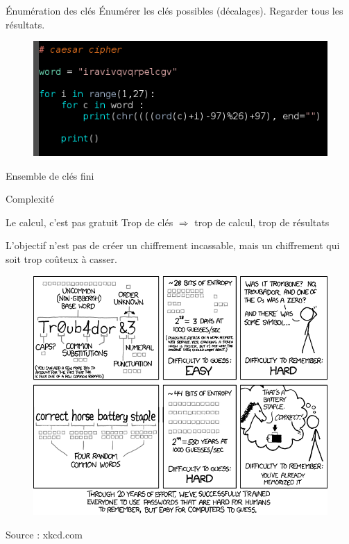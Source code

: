 \documentclass{beamer}
\begin{document}
\begin{frame}{Énumération des clés}
  Énumérer les clés possibles (décalages). Regarder tous les résultats.

  \begin{figure}
    \centering
    \includegraphics[scale = 0.6]{cesarcode.png}
\end{figure}

\begin{block}{}
Ensemble de clés fini
\end{block}

  \end{frame}



\begin{frame}{Complexité}

  \begin{alertblock}{Le calcul, c'est pas gratuit}
    Trop de clés $\Rightarrow$ trop de calcul, trop de résultats
\end{alertblock}
  L'objectif n'est pas de créer un chiffrement incassable, mais un chiffrement qui soit trop coûteux à casser.

  
  \begin{figure}
  \centering
  \includegraphics[scale = 0.2]{xkcdpassword_strength.png}
  \end{figure}
\footnotesize{Source : xkcd.com}
  \end{frame}
\end{document}
